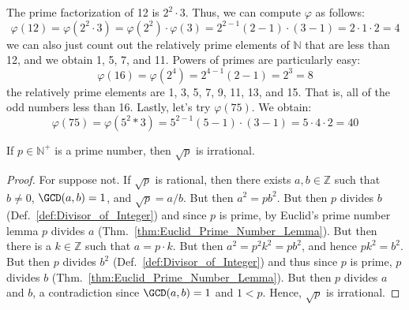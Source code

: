 \documentclass{article}                                                        %
\begin{document}
            \begin{example}
                The prime factorization of 12 is $2^{2}\cdot{3}$. Thus, we can
                compute $\varphi$ as follows:
                \begin{equation}
                    \varphi(12)=\varphi(2^{2}\cdot{3})
                        =\varphi(2^{2})\cdot\varphi(3)
                        =2^{2-1}(2-1)\cdot(3-1)=2\cdot{1}\cdot{2}=4
                \end{equation}
                we can also just count out the relatively prime elements of
                $\mathbb{N}$ that are less than 12, and we obtain 1, 5, 7, and 11.
                Powers of primes are particularly easy:
                \begin{equation}
                    \varphi(16)=\varphi(2^{4})=2^{4-1}(2-1)=2^{3}=8
                \end{equation}
                the relatively prime elements are 1, 3, 5, 7, 9, 11, 13, and 15.
                That is, all of the odd numbers less than 16. Lastly, let's try
                $\varphi(75)$. We obtain:
                \begin{equation}
                    \varphi(75)=\varphi(5^{2}*3)=5^{2-1}(5-1)\cdot(3-1)
                        =5\cdot{4}\cdot{2}=40
                \end{equation}
            \end{example}
            \begin{theorem}
                \label{thm:Primes_are_Irrational}%
                If $p\in\mathbb{N}^{+}$ is a prime number, then $\sqrt{p}$ is
                irrational.
            \end{theorem}
            \begin{proof}
                For suppose not. If $\sqrt{p}$ is rational, then there exists
                $a,b\in\mathbb{Z}$ such that $b\ne{0}$, $\GCD(a,b)=1$, and
                $\sqrt{p}=a/b$. But then $a^{2}=pb^{2}$. But then $p$ divides $b$
                (Def.~\ref{def:Divisor_of_Integer}) and since $p$ is prime, by
                Euclid's prime number lemma $p$ divides $a$
                (Thm.~\ref{thm:Euclid_Prime_Number_Lemma}). But then there is a
                $k\in\mathbb{Z}$ such that $a=p\cdot{k}$. But then
                $a^{2}=p^{2}k^{2}=pb^{2}$, and hence $pk^{2}=b^{2}$. But then
                $p$ divides $b^{2}$ (Def.~\ref{def:Divisor_of_Integer}) and thus
                since $p$ is prime, $p$ divides $b$
                (Thm.~\ref{thm:Euclid_Prime_Number_Lemma}). But then $p$ divides
                $a$ and $b$, a contradiction since $\GCD(a,b)=1$ and $1<p$. Hence,
                $\sqrt{p}$ is irrational.
            \end{proof}
\end{document}
